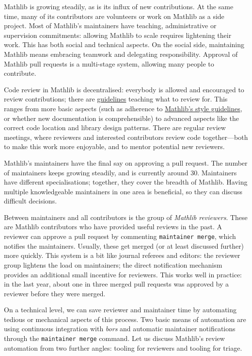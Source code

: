 \documentclass[runningheads]{llncs}
\def\Mathlib{Mathlib\xspace}
\def\mathlib{Mathlib\xspace}
\begin{document}
\Mathlib is growing steadily, as is its influx of new contributions. At the same time, many of its contributors are volunteers or work on \mathlib as a side project. Most of \mathlib's maintainers have teaching, administrative or supervision commitments: allowing \mathlib to scale requires lightening their work.
This has both social and technical aspects.
On the social side, maintaining \mathlib means embracing teamwork and delegating responsibility. Approval of \mathlib pull requests is a multi-stage system, allowing many people to contribute.

Code review in \mathlib is decentralised: everybody is allowed and encouraged to review contributions; there are \href{https://leanprover-community.github.io/contribute/pr-review.html}{guidelines} teaching what to review for. This ranges from more basic aspects (such as adherence to \href{https://leanprover-community.github.io/contribute/style.html}{\mathlib's style guidelines}, or whether new documentation is comprehensible) to advanced aspects like the correct code location and library design patterns.
There are regular review meetings, where reviewers and interested contributors review code together---both to make this work more enjoyable, and to mentor potential new reviewers.

\Mathlib's maintainers have the final say on approving a pull request. The number of maintainers keeps growing steadily, and is currently around 30. Maintainers have different specialisations; together, they cover the breadth of \mathlib. Having multiple knowledgeable maintainers in one area is beneficial, so they can discuss difficult decisions.

Between maintainers and all contributors is the group of \emph{\mathlib reviewers}. These are \mathlib contributors who have provided useful reviews in the past. A reviewer can approve a pull request by commenting \texttt{maintainer merge}, which notifies the maintainers. Usually, these get merged (or at least discussed further) more quickly. This system is a bit like journal referees and editors: the reviewer group lightens the load on maintainers; the direct notification mechanism provides an additional small incentive for reviewers.
This works well in practice: in the last year, about one in three merged pull requests was approved by a reviewer before they were merged.

On a technical level, we can save reviewer and maintainer time by automating tedious or mechanical aspects of this process. Two basic means of automation are using continuous integration with \emph{bors} and automatic maintainer notifications through the \texttt{maintainer merge} command.
Let us discuss \mathlib's review automation from two further angles: tooling for reviewers and tooling for triage.
\end{document}
